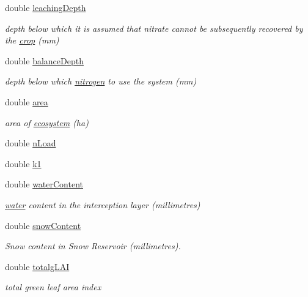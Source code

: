 \begin{DoxyCompactItemize}
double \hyperlink{classecosystem_a1fe02670ff76be100568aa00aeb123c4}{leachingDepth}
\begin{DoxyCompactList}\small\item\em depth below which it is assumed that nitrate cannot be subsequently recovered by the \hyperlink{classcrop}{crop} (mm) \item\end{DoxyCompactList}\item 
double \hyperlink{classecosystem_a622df48397a634ab7d4d9df06bf64688}{balanceDepth}
\begin{DoxyCompactList}\small\item\em depth below which \hyperlink{classnitrogen}{nitrogen} to use the system (mm) \item\end{DoxyCompactList}\item 
double \hyperlink{classecosystem_a8324bc15b82ac900c54afceed501d57d}{area}
\begin{DoxyCompactList}\small\item\em area of \hyperlink{classecosystem}{ecosystem} (ha) \item\end{DoxyCompactList}\item 
double \hyperlink{classecosystem_a2dd8b085d6e0a7d3308640fa4ab837fb}{nLoad}
\item 
double \hyperlink{classecosystem_a3e9deac833c64aa8764e5bbcf0e96a99}{k1}
\item 
double \hyperlink{classecosystem_a34e09ac34adc98d3c5269845fdd23e4b}{waterContent}
\begin{DoxyCompactList}\small\item\em \hyperlink{classwater}{water} content in the interception layer (millimetres) \item\end{DoxyCompactList}\item 
double \hyperlink{classecosystem_a4de898c78ce48f74bd668c5a6fb0cbfe}{snowContent}
\begin{DoxyCompactList}\small\item\em Snow content in Snow Reservoir (millimetres). \item\end{DoxyCompactList}\item 
double \hyperlink{classecosystem_adafee4145128b86c471661c5ad889054}{totalgLAI}
\begin{DoxyCompactList}\small\item\em total green leaf area index \item\end{DoxyCompactList}\item 

\end{DoxyCompactItemize}
